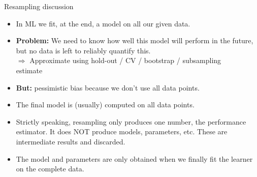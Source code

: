 \begin{vbframe}{Resampling discussion}

\begin{itemize}

  \item In ML we fit, at the end, a model on all our given data.\\

  \item \textbf{Problem:} We need to know how well this model will perform in 
  the future, but no data is left to reliably quantify this.\\
  $\Rightarrow$ Approximate using hold-out / CV / bootstrap / subsampling \\
  estimate\\ 

  \item \textbf{But:} pessimistic bias because we don't use all data points.\\

  \item The final model is (usually) computed on all data points.

  \item Strictly speaking, resampling only produces one number, the performance 
  estimator.
  It does NOT produce models, parameters, etc. These are intermediate results 
  and discarded.
  
  \item The model and parameters are only obtained when we finally fit the 
  learner on the complete data.

\end{itemize}

\framebreak

% 


\end{vbframe}

